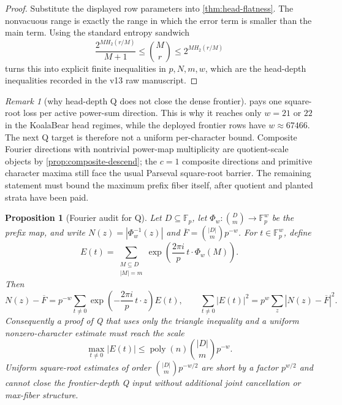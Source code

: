 \documentclass[a4paper,11pt]{amsart}
\newtheorem{proposition}[proposition]{Proposition}
\theoremstyle{remark}
\newtheorem{remark}[remark]{Remark}
\newcommand{\F}{\mathbb F}
\newcommand{\poly}{\operatorname{poly}}
\begin{document}
\begin{proof}
Substitute the displayed row parameters into \cref{thm:head-flatness}.  The nonvacuous range is exactly the range in which the error term is smaller than the main term.  Using the standard entropy sandwich
\[
        \frac{2^{M H_2(r/M)}}{M+1}\le \binom Mr\le 2^{M H_2(r/M)}
\]
turns this into explicit finite inequalities in \(p,N,m,w\), which are the head-depth inequalities recorded in the v13 raw manuscript.
\end{proof}

\begin{remark}[why head-depth Q does not close the dense frontier]\label{rem:head-does-not-close-q}
 pays one square-root loss per active power-sum direction.  This is why it reaches only \(w=21\) or \(22\) in the KoalaBear head regimes, while the deployed frontier rows have \(w\approx 67466\).  The next Q target is therefore not a uniform per-character bound.  Composite Fourier directions with nontrivial power-map multiplicity are quotient-scale objects by \cref{prop:composite-descend}; the \(c=1\) composite directions and primitive character maxima still face the usual Parseval square-root barrier.  The remaining statement must bound the maximum prefix fiber itself, after quotient and planted strata have been paid.
\end{remark}

\begin{proposition}[Fourier audit for Q]\label{prop:fourier-audit}
Let \(D\subseteq\F_p\), let \(\Phi_w:\binom{D}{m}\to\F_p^w\) be the prefix map, and write \(N(z)=|\Phi_w^{-1}(z)|\) and \(\overline F=\binom{|D|}{m}p^{-w}\).  For \(t\in\F_p^w\), define
\[
        E(t)=
        \sum_{\substack{M\subseteq D\\ |M|=m}}
        \exp\left(\frac{2\pi i}{p}\,t\cdot\Phi_w(M)\right).
\]
Then
\[
        N(z)-\overline F
        =
        p^{-w}\sum_{t\ne0}
        \exp\left(-\frac{2\pi i}{p}\,t\cdot z\right)E(t),
        \qquad
        \sum_{t\ne0}|E(t)|^2=p^w\sum_z |N(z)-\overline F|^2 .
\]
Consequently a proof of Q that uses only the triangle inequality and a uniform nonzero-character estimate must reach the scale
\[
        \max_{t\ne0}|E(t)|\le \poly(n)\binom{|D|}{m}p^{-w}.
\]
Uniform square-root estimates of order \(\binom{|D|}{m}p^{-w/2}\) are short by a factor \(p^{w/2}\) and cannot close the frontier-depth Q input without additional joint cancellation or max-fiber structure.
\end{proposition}
\end{document}
